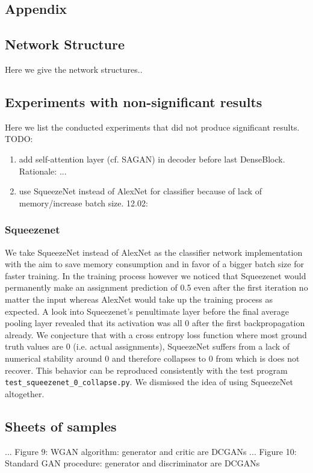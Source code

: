 \documentclass[12pt,a4paper]{article}
\begin{document}
\begin{appendices}
\section{Appendix}
\subsection{Network Structure}
Here we give the network structures..

\subsection{Experiments with non-significant results}
Here we list the conducted experiments that did not produce significant results. TODO:
\begin{enumerate}
  \item add self-attention layer (cf. SAGAN) in decoder before last DenseBlock. Rationale: ...
  \item use SqueezeNet instead of AlexNet for classifier because of lack of memory/increase batch size. 12.02: 
\end{enumerate}

\subsubsection{Squeezenet}
We take SqueezeNet instead of AlexNet as the classifier network implementation with the aim to save memory consumption and in favor of a bigger batch size for faster training. In the training process however we noticed that Squeezenet would permanently make an assignment prediction of 0.5 even after the first iteration no matter the input whereas AlexNet would take up the training process as expected. A look into Squeezenet's penultimate layer before the final average pooling layer revealed that its activation was all 0 after the first backpropagation already. We conjecture that with a cross entropy loss function where most ground truth values are 0 (i.e. actual assignments), SqueezeNet suffers from a lack of numerical stability around 0 and therefore collapses to 0 from which is does not recover. This behavior can be reproduced consistently with the test program \texttt{test\_squeezenet\_0\_collapse.py}. We dismissed the idea of using SqueezeNet altogether.

\subsection{Sheets of samples}
...
Figure 9: WGAN algorithm: generator and critic are DCGANs
...
Figure 10: Standard GAN procedure: generator and discriminator are DCGANs
\end{appendices}
\end{document}
